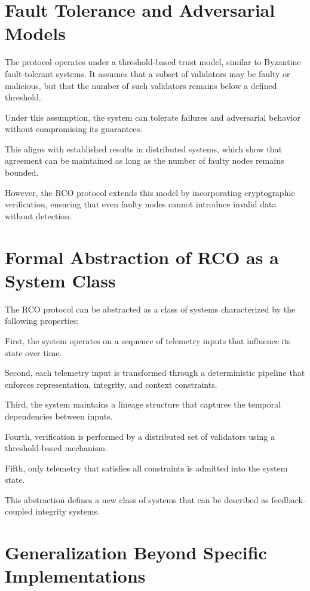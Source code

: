 \section{Fault Tolerance and Adversarial Models}

The protocol operates under a threshold-based trust model, similar to Byzantine fault-tolerant systems. It assumes that a subset of validators may be faulty or malicious, but that the number of such validators remains below a defined threshold.

Under this assumption, the system can tolerate failures and adversarial behavior without compromising its guarantees.

This aligns with established results in distributed systems, which show that agreement can be maintained as long as the number of faulty nodes remains bounded.

However, the RCO protocol extends this model by incorporating cryptographic verification, ensuring that even faulty nodes cannot introduce invalid data without detection.

\section{Formal Abstraction of RCO as a System Class}

The RCO protocol can be abstracted as a class of systems characterized by the following properties:

First, the system operates on a sequence of telemetry inputs that influence its state over time.

Second, each telemetry input is transformed through a deterministic pipeline that enforces representation, integrity, and context constraints.

Third, the system maintains a lineage structure that captures the temporal dependencies between inputs.

Fourth, verification is performed by a distributed set of validators using a threshold-based mechanism.

Fifth, only telemetry that satisfies all constraints is admitted into the system state.

This abstraction defines a new class of systems that can be described as feedback-coupled integrity systems.

\section{Generalization Beyond Specific Implementations}

